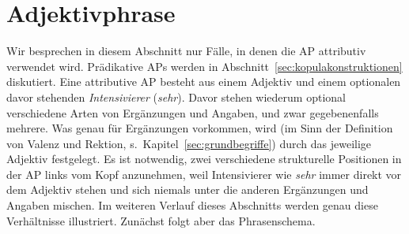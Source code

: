 \begin{exe}
  \ex\label{ex:grp9001}
  \begin{xlist}
  \end{xlist}
\end{exe}




\section{Adjektivphrase}

\label{sec:agr}

Wir besprechen in diesem Abschnitt nur Fälle, in denen die AP attributiv verwendet wird.
Prädikative APs werden in Abschnitt~\ref{sec:kopulakonstruktionen} diskutiert.
Eine attributive AP besteht aus einem Adjektiv und einem optionalen davor stehenden \textit{Intensivierer} (\zB \textit{sehr}).
Davor stehen wiederum optional verschiedene Arten von Ergänzungen und Angaben, und zwar gegebenenfalls mehrere. 
Was genau für Ergänzungen vorkommen, wird (im Sinn der Definition von Valenz und Rektion, s.\ Kapitel~\ref{sec:grundbegriffe}) durch das jeweilige Adjektiv festgelegt.
Es ist notwendig, zwei verschiedene strukturelle Positionen in der AP links vom Kopf anzunehmen, weil Intensivierer wie \textit{sehr} immer direkt vor dem Adjektiv stehen und sich niemals unter die anderen Ergänzungen und Angaben mischen.
Im weiteren Verlauf dieses Abschnitts werden genau diese Verhältnisse illustriert.
Zunächst folgt aber das Phrasenschema.



